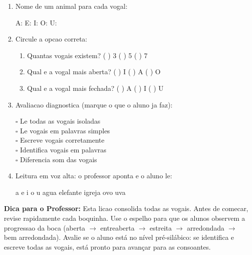 \begin{exercicio}
\begin{enumerate}[resume]
  \item Nome de um animal para cada vogal:
  \begin{center}
  A: \underline{\hspace{3cm}} \quad E: \underline{\hspace{3cm}} \quad I: \underline{\hspace{3cm}} \quad O: \underline{\hspace{3cm}} \quad U: \underline{\hspace{3cm}}
  \end{center}

  \item Circule a opcao correta:
  \begin{enumerate}[label=(\alph*)]
    \item Quantas vogais existem? ( ) 3 ( ) 5 ( ) 7
    \item Qual e a vogal mais aberta? ( ) I ( ) A ( ) O
    \item Qual e a vogal mais fechada? ( ) A ( ) I ( ) U
  \end{enumerate}

  \item Avaliacao diagnostica (marque o que o aluno ja faz):
  \begin{center}
  $\square$ Le todas as vogais isoladas\\
  $\square$ Le vogais em palavras simples\\
  $\square$ Escreve vogais corretamente\\
  $\square$ Identifica vogais em palavras\\
  $\square$ Diferencia som das vogais
  \end{center}

  \item Leitura em voz alta: o professor aponta e o aluno le:
  \begin{center}
  a \quad e \quad i \quad o \quad u \quad agua \quad elefante \quad igreja \quad ovo \quad uva
  \end{center}
\end{enumerate}
\end{exercicio}

\begin{dica}
\textbf{Dica para o Professor:} Esta licao consolida todas as vogais. Antes de comecar, revise rapidamente cada boquinha. Use o espelho para que os alunos observem a progressao da boca (aberta $\rightarrow$ entreaberta $\rightarrow$ estreita $\rightarrow$ arredondada $\rightarrow$ bem arredondada). Avalie se o aluno est\'a no n\'ivel pr\'e-sil\'abico: se identifica e escreve todas as vogais, est\'a pronto para avan\c{c}ar para as consoantes.
\end{dica}

